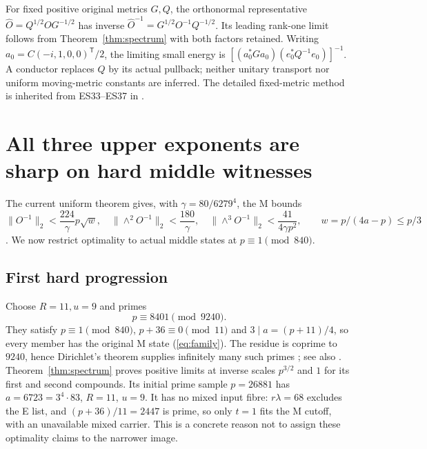 

For fixed positive original metrics $G,Q$, the orthonormal representative
$\widehat O=Q^{1/2}OG^{-1/2}$ has inverse
$\widehat O^{-1}=G^{1/2}O^{-1}Q^{-1/2}$. Its leading rank-one limit follows from
Theorem~\ref{thm:spectrum} with both factors retained. Writing
$a_0=C(-i,1,0,0)^{\mathsf T}/2$, the limiting small energy is
$[(a_0^*Ga_0)(e_0^*Q^{-1}e_0)]^{-1}$.
A conductor replaces $Q$ by its actual pullback; neither unitary transport
nor uniform moving-metric constants are inferred. The detailed fixed-metric
method is inherited from ES33--ES37 in \citet{EScont}.

\section{All three upper exponents are sharp on hard middle witnesses}
The current uniform theorem gives, with $\gamma=80/6279^4$, the M bounds
\[
 \|O^{-1}\|_2<\frac{224}{\gamma}p\sqrt w,
 \quad \|\wedge^2O^{-1}\|_2<\frac{180}{\gamma},
 \quad \|\wedge^3O^{-1}\|_2<\frac{41}{4\gamma p^2},
 \qquad w=p/(4a-p)\le p/3
\]
\citep[Theorem 1.1 and middle cofactor proof]{Sharp}.
We now restrict optimality to actual middle states at $p\equiv1\pmod{840}$.

\subsection{First hard progression}
Choose $R=11,u=9$ and primes
\[
 p\equiv8401\pmod{9240}.
\]
They satisfy $p\equiv1\pmod{840}$, $p+36\equiv0\pmod{11}$ and
$3\mid a=(p+11)/4$, so every member has the original M state
(\ref{eq:family}). The residue is coprime to $9240$, hence Dirichlet's theorem
supplies infinitely many such primes
\citep[conclusion at source lines 1257--1265]{DirichletOriginal}; see also
\citet[Theorem 18.1, p.~1]{Dirichlet}.
Theorem~\ref{thm:spectrum} proves positive limits at inverse scales
$p^{3/2}$ and $1$ for its first and second compounds. Its initial prime sample
$p=26881$ has $a=6723=3^4\cdot83$, $R=11$, $u=9$. It has no mixed input
fibre: $r\lambda=68$ excludes the E list, and $(p+36)/11=2447$ is prime,
so only $t=1$ fits the M cutoff, with an unavailable mixed carrier. This is
a concrete reason not to assign these optimality claims to the narrower image.

